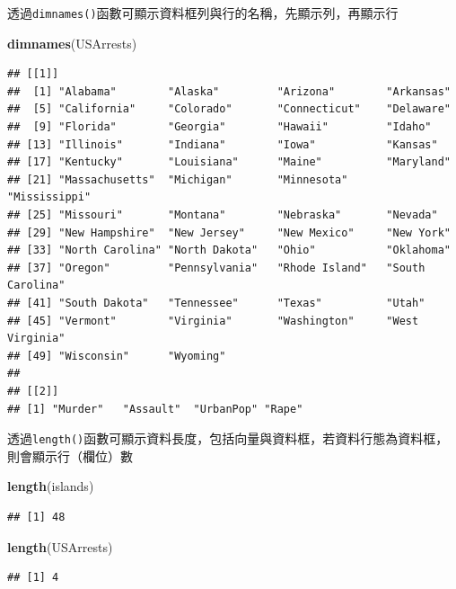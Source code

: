 \documentclass[]{book}
\newenvironment{Shaded}{\begin{snugshade}}{\end{snugshade}}
\newcommand{\KeywordTok}[1]{\textcolor[rgb]{0.13,0.29,0.53}{\textbf{{#1}}}}
\newcommand{\NormalTok}[1]{{#1}}
\theoremstyle{definition}
\theoremstyle{definition}
\theoremstyle{remark}
\begin{document}
透過\texttt{dimnames()}函數可顯示資料框列與行的名稱，先顯示列，再顯示行

\begin{Shaded}
\begin{Highlighting}[]
\KeywordTok{dimnames}\NormalTok{(USArrests) }
\end{Highlighting}
\end{Shaded}

\begin{verbatim}
## [[1]]
##  [1] "Alabama"        "Alaska"         "Arizona"        "Arkansas"      
##  [5] "California"     "Colorado"       "Connecticut"    "Delaware"      
##  [9] "Florida"        "Georgia"        "Hawaii"         "Idaho"         
## [13] "Illinois"       "Indiana"        "Iowa"           "Kansas"        
## [17] "Kentucky"       "Louisiana"      "Maine"          "Maryland"      
## [21] "Massachusetts"  "Michigan"       "Minnesota"      "Mississippi"   
## [25] "Missouri"       "Montana"        "Nebraska"       "Nevada"        
## [29] "New Hampshire"  "New Jersey"     "New Mexico"     "New York"      
## [33] "North Carolina" "North Dakota"   "Ohio"           "Oklahoma"      
## [37] "Oregon"         "Pennsylvania"   "Rhode Island"   "South Carolina"
## [41] "South Dakota"   "Tennessee"      "Texas"          "Utah"          
## [45] "Vermont"        "Virginia"       "Washington"     "West Virginia" 
## [49] "Wisconsin"      "Wyoming"       
## 
## [[2]]
## [1] "Murder"   "Assault"  "UrbanPop" "Rape"
\end{verbatim}

透過\texttt{length()}函數可顯示資料長度，包括向量與資料框，若資料行態為資料框，則會顯示行（欄位）數

\begin{Shaded}
\begin{Highlighting}[]
\KeywordTok{length}\NormalTok{(islands) }
\end{Highlighting}
\end{Shaded}

\begin{verbatim}
## [1] 48
\end{verbatim}

\begin{Shaded}
\begin{Highlighting}[]
\KeywordTok{length}\NormalTok{(USArrests) }
\end{Highlighting}
\end{Shaded}

\begin{verbatim}
## [1] 4
\end{verbatim}
\end{document}

